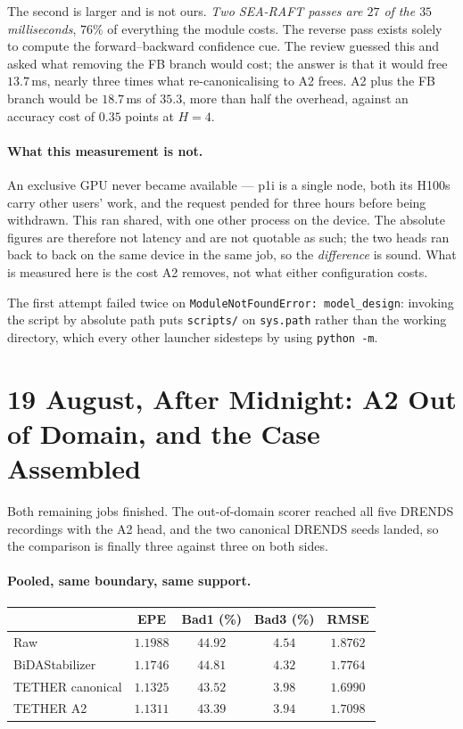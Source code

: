 \documentclass[11pt,a4paper]{article}
\begin{document}
The second is larger and is not ours. \emph{Two SEA-RAFT passes are $27$ of the
$35$ milliseconds}, $76\%$ of everything the module costs. The reverse pass exists
solely to compute the forward--backward confidence cue. The review guessed this
and asked what removing the FB branch would cost; the answer is that it would
free $13.7$\,ms, nearly three times what re-canonicalising to A2 frees. A2 plus
the FB branch would be $18.7$\,ms of $35.3$, more than half the overhead, against
an accuracy cost of $0.35$ points at $H{=}4$.

\paragraph{What this measurement is not.} An exclusive GPU never became available
--- p1i is a single node, both its H100s carry other users' work, and the request
pended for three hours before being withdrawn. This ran shared, with one other
process on the device. The absolute figures are therefore not latency and are not
quotable as such; the two heads ran back to back on the same device in the same
job, so the \emph{difference} is sound. What is measured here is the cost A2
removes, not what either configuration costs.

The first attempt failed twice on \texttt{ModuleNotFoundError: model\_design}:
invoking the script by absolute path puts \texttt{scripts/} on \texttt{sys.path}
rather than the working directory, which every other launcher sidesteps by using
\texttt{python -m}.


\section*{19 August, After Midnight: A2 Out of Domain, and the Case Assembled}

Both remaining jobs finished. The out-of-domain scorer reached all five DRENDS
recordings with the A2 head, and the two canonical DRENDS seeds landed, so the
comparison is finally three against three on both sides.

\paragraph{Pooled, same boundary, same support.}

\begin{center}
\begin{tabular}{lcccc}
\toprule
& EPE & Bad1 (\%) & Bad3 (\%) & RMSE \\
\midrule
Raw               & $1.1988$ & $44.92$ & $4.54$ & $1.8762$ \\
BiDAStabilizer    & $1.1746$ & $44.81$ & $4.32$ & $1.7764$ \\
TETHER canonical  & $1.1325$ & $43.52$ & $3.98$ & $\mathbf{1.6990}$ \\
TETHER A2         & $\mathbf{1.1311}$ & $\mathbf{43.39}$ & $\mathbf{3.94}$ & $1.7098$ \\
\bottomrule
\end{tabular}
\end{center}
\end{document}
